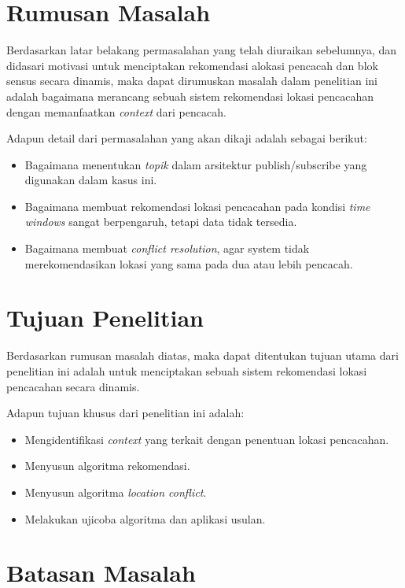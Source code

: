 \section{Rumusan Masalah}

Berdasarkan latar belakang permasalahan yang telah diuraikan sebelumnya, dan didasari motivasi untuk menciptakan rekomendasi alokasi pencacah dan blok sensus secara dinamis, maka dapat dirumuskan masalah dalam penelitian ini adalah bagaimana merancang sebuah sistem rekomendasi lokasi pencacahan dengan memanfaatkan \textit{context} dari pencacah.


Adapun detail dari permasalahan yang akan dikaji adalah sebagai berikut:

\begin{itemize}
\item Bagaimana menentukan \textit{topik} dalam arsitektur publish/subscribe yang digunakan dalam kasus ini.
\item Bagaimana membuat rekomendasi lokasi pencacahan pada kondisi \textit{time windows} sangat berpengaruh, tetapi data tidak tersedia.
\item Bagaimana membuat \textit{conflict resolution}, agar system tidak merekomendasikan lokasi yang sama pada dua atau lebih pencacah.
\end{itemize}


\section{Tujuan Penelitian}

Berdasarkan rumusan masalah diatas, maka dapat ditentukan tujuan utama dari penelitian ini adalah untuk menciptakan sebuah sistem rekomendasi lokasi pencacahan secara dinamis. 

Adapun tujuan khusus dari penelitian ini adalah:

\begin{itemize}
\item Mengidentifikasi \textit{context} yang terkait dengan penentuan lokasi pencacahan.
\item Menyusun algoritma rekomendasi.
\item Menyusun algoritma \textit{location conflict}.
\item Melakukan ujicoba algoritma dan aplikasi usulan.
\end{itemize}


\section{Batasan Masalah}

